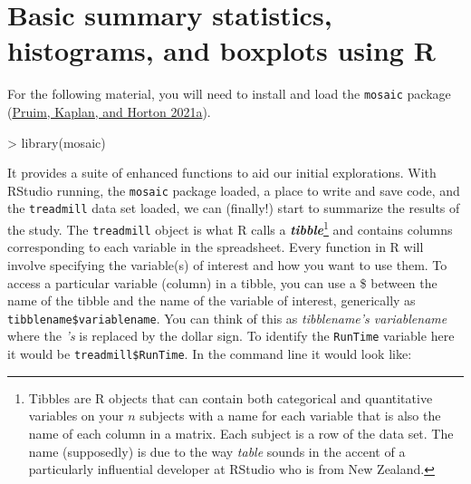 \documentclass[
]{book}
\newenvironment{Shaded}{\begin{snugshade}}{\end{snugshade}}
\newcommand{\DecValTok}[1]{\textcolor[rgb]{0.00,0.00,0.81}{#1}}
\newcommand{\FloatTok}[1]{\textcolor[rgb]{0.00,0.00,0.81}{#1}}
\newcommand{\FunctionTok}[1]{\textcolor[rgb]{0.00,0.00,0.00}{#1}}
\newcommand{\NormalTok}[1]{#1}
\newcommand{\SpecialCharTok}[1]{\textcolor[rgb]{0.00,0.00,0.00}{#1}}
\begin{document}
\hypertarget{section1-3}{%
\section{Basic summary statistics, histograms, and boxplots using R}\label{section1-3}}

For the following material, you will need to install and load the \texttt{mosaic} package (\protect\hyperlink{ref-R-mosaic}{Pruim, Kaplan, and Horton 2021a}).


\begin{Shaded}
\begin{Highlighting}[]
\SpecialCharTok{\textgreater{}} \FunctionTok{library}\NormalTok{(mosaic)}
\end{Highlighting}
\end{Shaded}

It provides a suite of enhanced functions to aid our initial explorations. With RStudio running, the \texttt{mosaic} package loaded, a place to write and
save code, and the \texttt{treadmill} data set loaded, we can (finally!) start to
summarize the results of the study. The \texttt{treadmill} object is what R calls a
\textbf{\emph{tibble}}\footnote{Tibbles are R objects that can contain both
  categorical and quantitative variables on your \(n\) subjects with a name for each
  variable that is also the name of each column in a matrix.  Each subject is a
  row of the data set. The name (supposedly) is due to the way \emph{table} sounds in the accent of a particularly influential developer at RStudio who is from New Zealand.} and contains columns corresponding to each variable in
the spreadsheet. Every
function in R will involve specifying the variable(s) of interest and how you
want to use them. To access a particular variable (column) in a tibble, you
can use a \$ between the name of the tibble and the name of the variable of
interest, generically as \texttt{tibblename\$variablename}. You can think of this as \emph{tibblename's variablename} where the \emph{'s} is replaced by the dollar sign. To identify the
\texttt{RunTime} variable here it would be \texttt{treadmill\$RunTime}. In the command line it would look like:

\begin{Shaded}
\end{Shaded}
\end{document}
